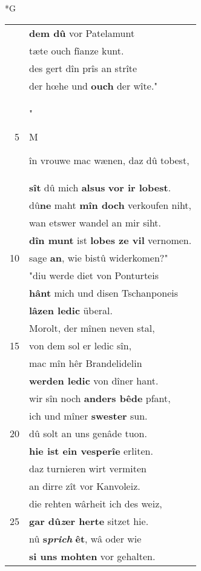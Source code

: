 \documentclass[8pt,a4paper,notitlepage]{article}
\begin{document}
\newpage
\begin{table}[ht]
\begin{minipage}[t]{0.5\linewidth}
\small
\begin{center}*G
\end{center}
\begin{tabular}{rl}
 & \textbf{dem dû} vor Patelamunt\\ 
 & tæte ouch fîanze kunt.\\ 
 & des gert dîn prîs an strîte\\ 
 & der hœhe und \textbf{ouch} der wîte."\\ 
5 & "\begin{large}M\end{large}în vrouwe mac wænen, daz dû tobest,\\ 
 & \textbf{sît} dû mich \textbf{alsus} \textbf{vor ir lobest}.\\ 
 & dû\textbf{ne} maht \textbf{mîn doch} verkoufen niht,\\ 
 & wan etswer wandel an mir siht.\\ 
 & \textbf{dîn munt} ist \textbf{lobes ze vil} vernomen.\\ 
10 & sage \textbf{an}, wie bistû widerkomen?"\\ 
 & "diu werde diet von Ponturteis\\ 
 & \textbf{hânt} mich und disen Tschanponeis\\ 
 & \textbf{lâzen ledic} überal.\\ 
 & Morolt, der mînen neven stal,\\ 
15 & von dem sol er ledic sîn,\\ 
 & mac mîn hêr Brandelidelin\\ 
 & \textbf{werden ledic} von dîner hant.\\ 
 & wir sîn noch \textbf{anders bêde} pfant,\\ 
 & ich und mîner \textbf{swester} sun.\\ 
20 & dû solt an uns genâde tuon.\\ 
 & \textbf{hie ist ein vesperîe} erliten.\\ 
 & daz turnieren wirt vermiten\\ 
 & an dirre zît vor Kanvoleiz.\\ 
 & die rehten wârheit ich des weiz,\\ 
25 & \textbf{gar dû\textit{z}er herte} sitzet hie.\\ 
 & nû \textbf{s\textit{prich}} \textbf{êt}, wâ oder wie\\ 
 & \textbf{si uns mohten} vor gehalten.\\ 

\end{tabular}
\end{minipage}
\end{table}
\end{document}
